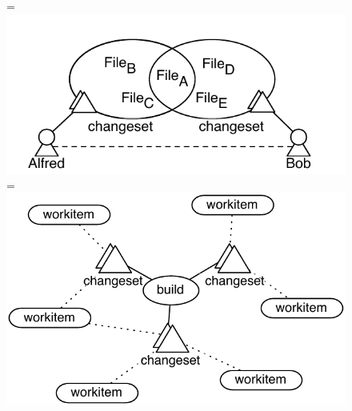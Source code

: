 \begin{figure}
  =\hbox{\includegraphics{figures/cochangedfiles}}%
  =\hbox{\includegraphics{figures/buildworkitem}}%
	

\end{figure}
